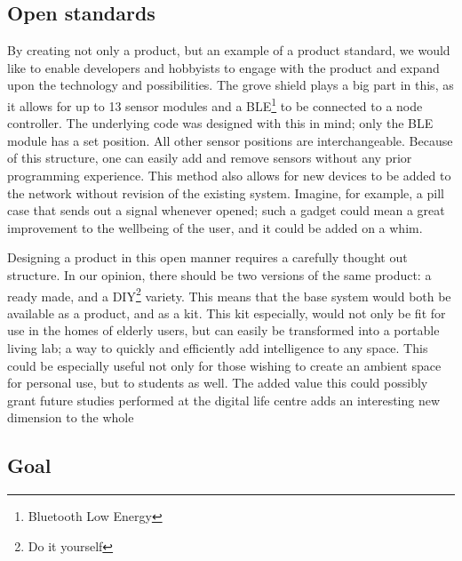 \documentclass{below-ext}
\begin{document}
\subsection{Open standards}

By creating not only a product, but an example of a product standard, we would like to enable developers and hobbyists to engage with the product and expand upon the technology and possibilities. The grove shield plays a big part in this, as it allows for up to 13 sensor modules and a BLE\footnote{Bluetooth Low Energy} to be connected to a node controller. The underlying code was designed with this in mind; only the BLE module has a set position. All other sensor positions are interchangeable. Because of this structure, one can easily add and remove sensors without any prior programming experience. This method also allows for new devices to be added to the network without revision of the existing system. Imagine, for example, a pill case that sends out a signal whenever opened; such a gadget could mean a great improvement to the wellbeing of the user, and it could be added on a whim. 

Designing a product in this open manner requires a carefully thought out structure. In our opinion, there should be two versions of the same product: a ready made, and a DIY\footnote{Do it yourself} variety. This means that the base system would both be available as a product, and as a kit. This kit especially, would not only be fit for use in the homes of elderly users, but can easily be transformed into a portable living lab; a way to quickly and efficiently add intelligence to any space. This could be especially useful not only for those wishing to create an ambient space for personal use, but to students as well. The added value this could possibly grant future studies performed at the digital life centre adds an interesting new dimension to the whole


\subsection{Goal}
\end{document}
